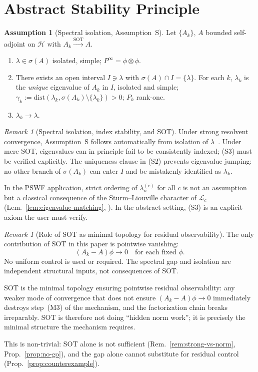 \documentclass[12pt,a4paper]{amsart}
\theoremstyle{definition}
\newtheorem{assumption}[theorem]{Assumption}
\theoremstyle{remark}
\newtheorem{remark}[theorem]{Remark}
\newcommand{\dist}{\mathrm{dist}}
\begin{document}
\section{Abstract Stability Principle}
\label{sec:abstract}

\begin{assumption}[Spectral isolation,
  Assumption~S]
\label{ass:spectral-isolation}
Let $\{A_k\}$, $A$ bounded self-adjoint
on $\mathcal{H}$ with
$A_k\xrightarrow{\mathrm{SOT}} A$.
\begin{enumerate}[\rm(S1)]
\item\label{S1}
  $\lambda\in\sigma(A)$ isolated,
  simple; $P^\infty=\phi\otimes\phi$.
\item\label{S2}
  There exists an open interval
  $I\ni\lambda$ with
  $\sigma(A)\cap I=\{\lambda\}$.
  For each $k$, $\lambda_k$ is the
  \emph{unique} eigenvalue of $A_k$
  in $I$, isolated and simple;
  $\gamma_k:=\dist(\lambda_k,
  \sigma(A_k)\setminus\{\lambda_k\})
  >0$; $P_k$ rank-one.
\item\label{S3}
  $\lambda_k\to\lambda$.
\end{enumerate}
\end{assumption}

\begin{remark}[Spectral isolation,
  index stability, and SOT]
\label{rem:spectral-isolation}
Under strong resolvent convergence,
Assumption~S follows automatically
from isolation of
$\lambda$~\cite[Ch.~VIII]{Kato1966}.
Under mere SOT, eigenvalues can in
principle fail to be consistently
indexed; (S3) must be verified
explicitly.
The uniqueness clause in (S2) prevents
eigenvalue jumping: no other branch
of $\sigma(A_k)$ can enter $I$ and
be mistakenly identified as $\lambda_k$.

In the PSWF application, strict
ordering of $\lambda_n^{(c)}$ for
all $c$ is not an assumption but a
classical consequence of the
Sturm--Liouville character of
$\mathcal{L}_c$
(Lem.~\ref{lem:eigenvalue-matching},
\cite[Sec.~3.2]{Osipov2013}).
In the abstract setting, (S3) is an
explicit axiom the user must verify.
\end{remark}

\begin{remark}[Role of SOT as minimal
  topology for residual observability]
\label{rem:sot-role}
The only contribution of SOT in this
paper is pointwise vanishing:
\[
  (A_k-A)\phi\to 0
  \quad\text{for each fixed }\phi.
\]
No uniform control is used or required.
The spectral gap and isolation are
independent structural inputs,
not consequences of SOT.

SOT is the minimal topology ensuring
pointwise residual observability:
any weaker mode of convergence that
does not ensure $(A_k-A)\phi\to 0$
immediately destroys step~(M3) of
the mechanism, and the factorization
chain breaks irreparably.
SOT is therefore not doing ``hidden
norm work''; it is precisely the
minimal structure the mechanism
requires.

This is non-trivial:
SOT alone is not sufficient
(Rem.~\ref{rem:strong-vs-norm},
Prop.~\ref{prop:no-go}),
and the gap alone cannot substitute
for residual control
(Prop.~\ref{prop:counterexample}).
\end{remark}
\end{document}
